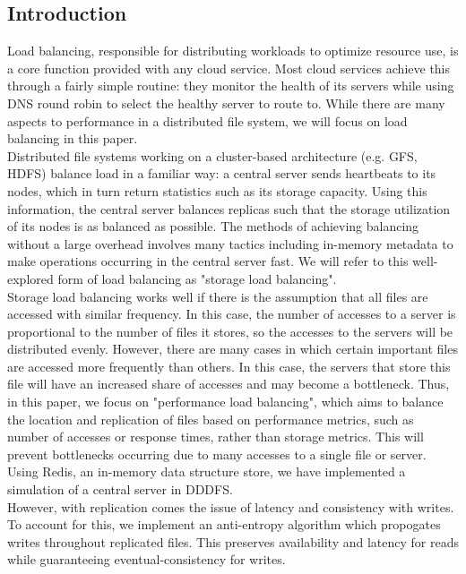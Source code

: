 \documentclass[twoside]{article}
\begin{document}
\begin{multicols}{2} %

\section{Introduction}
Load balancing, responsible for distributing workloads to optimize resource use, is a core function provided with any cloud service. Most cloud services achieve this through a fairly simple routine: they monitor the health of its servers while using DNS round robin to select the healthy server to route to. While there are many aspects to performance in a distributed file system, we will focus on load balancing in this paper.\\\indent
Distributed file systems working on a cluster-based architecture (e.g. GFS, HDFS) balance load in a familiar way: a central server sends heartbeats to its nodes, which in turn return statistics such as its storage capacity.  Using this information, the central server balances replicas such that the storage utilization of its nodes is as balanced as possible. The methods of achieving balancing without a large overhead involves many tactics including in-memory metadata to make operations occurring in the central server fast. We will refer to this well-explored form of load balancing as "storage load balancing".\\\indent
Storage load balancing works well if there is the assumption that all files are accessed with similar frequency. In this case, the number of accesses to a server is proportional to the number of files it stores, so the accesses to the servers will be distributed evenly. However, there are many cases in which certain important files are accessed more frequently than others. In this case, the servers that store this file will have an increased share of accesses and may become a bottleneck. Thus, in this paper, we focus on "performance load balancing", which aims to balance the location and replication of files based on performance metrics, such as number of accesses or response times, rather than storage metrics. This will prevent bottlenecks occurring due to many accesses to a single file or server. Using Redis, an in-memory data structure store, we have implemented a simulation of a central server in DDDFS. \\\indent
However, with replication comes the issue of latency and consistency with writes. To account for this, we implement an anti-entropy algorithm which propogates writes throughout replicated files. This preserves availability and latency for reads while guaranteeing eventual-consistency for writes.


\end{multicols}
\end{document}
